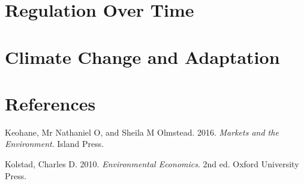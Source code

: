 \documentclass[
]{book}
\begin{document}
\hypertarget{regulation-over-time}{%
\chapter{Regulation Over Time}\label{regulation-over-time}}

\hypertarget{climate-change-and-adaptation}{%
\chapter{Climate Change and Adaptation}\label{climate-change-and-adaptation}}

\hypertarget{references}{%
\chapter*{References}\label{references}}

\hypertarget{refs}{}
\leavevmode\hypertarget{ref-keohane2016}{}%
Keohane, Mr Nathaniel O, and Sheila M Olmstead. 2016. \emph{Markets and the Environment}. Island Press.

\leavevmode\hypertarget{ref-kolstad2010}{}%
Kolstad, Charles D. 2010. \emph{Environmental Economics}. 2nd ed. Oxford University Press.
\end{document}

